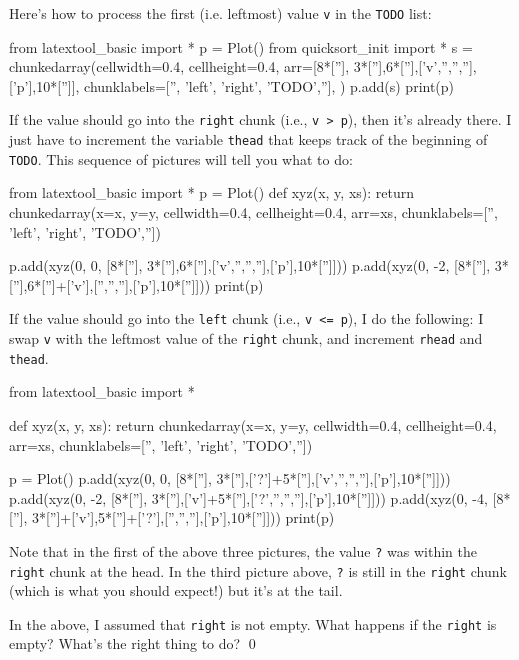 Here's how to process the first (i.e. leftmost) value \verb!v!
in the \verb!TODO! list:
\begin{python}
from latextool_basic import *
p = Plot()
from quicksort_init import *
s = chunkedarray(cellwidth=0.4, 
                   cellheight=0.4,
                   arr=[8*[''], 3*[''],6*[''],['v','','',''],['p'],10*['']],
                   chunklabels=['', 'left', 'right', 'TODO',''],
)
p.add(s)
print(p)
\end{python}

If the value should go into the \verb!right! chunk
(i.e., \verb!v > p!), then it's already there.
I just have to increment the variable \verb!thead! that keeps track of the 
beginning of \verb!TODO!.
This sequence of pictures will tell you what to do:
\begin{python}
from latextool_basic import *
p = Plot()
def xyz(x, y, xs):
    return chunkedarray(x=x, y=y,
                        cellwidth=0.4, cellheight=0.4,
                        arr=xs,
                        chunklabels=['', 'left', 'right', 'TODO',''])

p.add(xyz(0, 0, [8*[''], 3*[''],6*[''],['v','','',''],['p'],10*['']]))
p.add(xyz(0, -2, [8*[''], 3*[''],6*['']+['v'],['','',''],['p'],10*['']]))
print(p)
\end{python}

If the value should go into the \verb!left! chunk (i.e., \verb!v <= p!), 
I do the following: I swap \verb!v!
with the leftmost value of the \verb!right! chunk,
and increment \verb!rhead! and \verb!thead!.
\begin{python}
from latextool_basic import *

def xyz(x, y, xs):
    return chunkedarray(x=x, y=y,
                        cellwidth=0.4, cellheight=0.4,
                        arr=xs,
                        chunklabels=['', 'left', 'right', 'TODO',''])

p = Plot()
p.add(xyz(0, 0, [8*[''], 3*[''],['?']+5*[''],['v','','',''],['p'],10*['']]))
p.add(xyz(0, -2, [8*[''], 3*[''],['v']+5*[''],['?','','',''],['p'],10*['']]))
p.add(xyz(0, -4, [8*[''], 3*['']+['v'],5*['']+['?'],['','',''],['p'],10*['']]))
print(p)
\end{python}
Note that in the first of the above three pictures,
the value \verb!?! was within the \verb!right! chunk
at the head.
In the third picture above, 
\verb!?! is still in the \verb!right! chunk
(which is what you should expect!) but it's at the tail.

\newpage
\begin{ex}
In the above, I assumed that \verb!right!
is not empty.
What happens if the \verb!right! is empty?
What's the right thing to do?
\qed
\end{ex}


